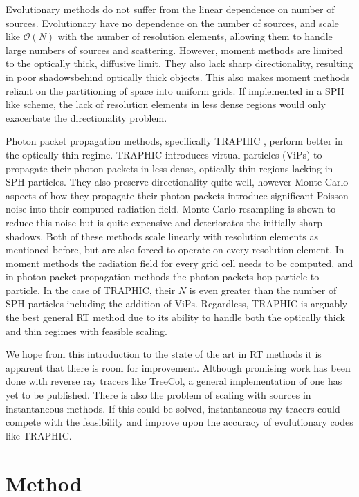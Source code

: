\documentclass[fleq,usenatbib]{mnras}
\begin{document}
Evolutionary methods do not suffer from the linear dependence on number of 
sources. Evolutionary have no dependence on the number of sources, and 
scale like $\mathcal{O}(N)$ with the number of resolution elements, allowing 
them to handle large numbers of sources and scattering. However, moment 
methods are limited to the optically thick, diffusive limit. They also lack 
sharp directionality, resulting in poor shadowsbehind optically thick objects. 
This also makes moment methods reliant on the partitioning of space into 
uniform grids. If implemented in a SPH like scheme, the lack of resolution 
elements in less dense regions would only exacerbate the directionality 
problem. 

Photon packet propagation methods, specifically TRAPHIC 
\citep{pawlikSchaye08}, perform better in the optically thin regime. TRAPHIC 
introduces virtual particles (ViPs) to propagate their photon packets in less 
dense, optically thin regions lacking in SPH particles. They also preserve 
directionality quite well, however Monte Carlo aspects of how they propagate 
their photon packets introduce significant Poisson noise into their computed 
radiation field. Monte Carlo resampling is shown to reduce this noise but is 
quite expensive and deteriorates the initially sharp shadows. Both of these 
methods scale linearly with resolution elements as mentioned before, but are 
also forced to operate on every resolution element. In moment methods the 
radiation field for every grid cell needs to be computed, and in photon packet 
propagation methods the photon packets hop particle to particle. In the case 
of TRAPHIC, their $N$ is even greater than the number of SPH particles 
including the addition of ViPs. Regardless, TRAPHIC is arguably the best 
general RT method due to its ability to handle both the optically thick and 
thin regimes with feasible scaling.

We hope from this introduction to the state of the art in RT methods it is 
apparent that there is room for improvement. Although promising work has been 
done with reverse ray tracers like TreeCol, a general implementation of one 
has yet to be published. There is also the problem of scaling with sources in 
instantaneous methods. If this could be solved, instantaneous ray tracers 
could compete with the feasibility and improve upon the accuracy of 
evolutionary codes like TRAPHIC.

\section{Method}\label{sec:mthd}
\end{document}
